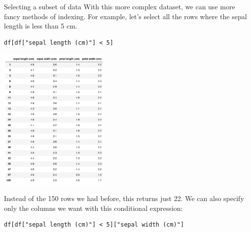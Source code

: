 \documentclass[10pt]{beamer}
\begin{document}
\begin{frame}[label={sec:orgb1c6d6a},fragile]{Selecting a subset of data}
 With this more complex dataset, we can use more fancy methods of indexing. For
example, let's select all the rows where the sepal length is less than 5 cm.

\begin{verbatim}
df[df["sepal length (cm)"] < 5]
\end{verbatim}

\begin{center}
\includegraphics[width=0.4\textwidth]{images/subset.png}
\end{center}

Instead of the 150 rows we had before, this returns just 22. We can also specify
only the columns we want with this conditional expression:

\begin{verbatim}
df[df["sepal length (cm)"] < 5]["sepal width (cm)"]
\end{verbatim}
\end{frame}
\end{document}
